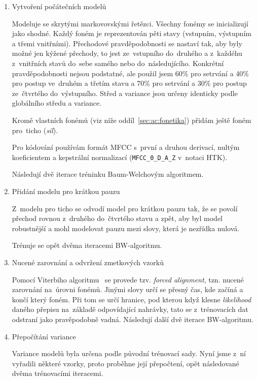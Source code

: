 \begin{enumerate}

\item{Vytvoření počátečních modelů}

Modeluje se skrytými markovovskými řetězci. Všechny fonémy se inicializují jako
shodné. Každý foném je reprezentován pěti stavy (vstupním, výstupním a třemi
vnitřními). Přechodové pravděpodobnosti se nastaví tak, aby byly možné jen
kýžené přechody, to jest ze~vstupního do~druhého a z~každéhu z~vnitřních stavů
do~sebe samého nebo do~následujícího. Konkrétní pravděpodobnosti nejsou
podstatné, ale použil jsem 60\% pro setrvání a 40\% pro postup ve~druhém a
třetím stavu a 70\% pro setrvání a 30\% pro postup ze~čtvrtého do~výstupního.
Střed a variance jsou určeny identicky podle globálního středu a variance.

Kromě vlastních fonémů (viz níže oddíl~\ref{sec:ac:fonetika}) přidám ještě foném
pro~ticho (\textit{sil}).

Pro kódování používám formát MFCC s~první a druhou derivací, nultým koeficientem
a kepstrální normalizací (\texttt{MFCC\_0\_D\_A\_Z} v~notaci HTK).

Následují dvě iterace tréninku Baum-Welchovým algoritmem\cite{welch2003hidden}.

\item{Přidání modelu pro krátkou pauzu}

Z~modelu pro ticho se odvodí model pro krátkou pauzu tak, že se povolí přechod
rovnou z~druhého do~čtvrtého stavu a zpět, aby byl model robustnější a mohl
modelovat pauzu mezi slovy, která je nezřídka nulová.

Trénuje se opět dvěma iteracemi BW-algoritmu.

\item{Nucené zarovnání a odvržení zmetkových vzorků}

Pomocí Viterbiho algoritmu~\cite{forney1973viterbi} se provede tzv.
\textit{forced alignment}, tzn. nucené zarovnání na~úrovni fonémů. Jinými slovy
určí se přesný čas, kde začíná a končí který foném. Při tom se určí hranice, pod
kterou když klesne \textit{likelihood} daného přepisu na~základě odpovídající
nahrávky, tato se z~trénovacích dat odstraní jako pravěpodobně vadná. Následují
další dvě iterace BW-algoritmu.

\item{Přepočítání variance}

Variance modelů byla určena podle původní trénovací sady. Nyní jsme z~ní
vyřadili některé vzorky, proto proběhne její přepočtení, opět následované dvěma
trénovacími iteracemi.


\end{enumerate}
